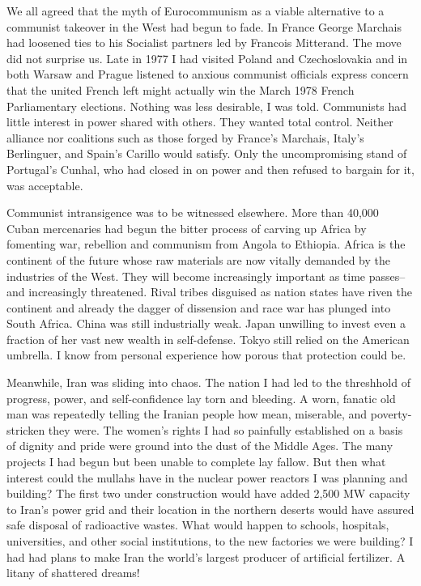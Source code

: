 We all agreed that the myth of Eurocommunism as a viable alternative to a communist takeover in the West had begun to fade. In France George Marchais had loosened ties to his Socialist partners led by Francois Mitterand. The move did not surprise us. Late in 1977 I had visited Poland and Czechoslovakia and in both Warsaw and Prague listened to anxious communist officials express concern that the united French left might actually win the March 1978 French Parliamentary elections. Nothing was less desirable, I was told. Communists had little interest in power shared with others. They wanted total control. Neither alliance nor coalitions such as those forged by France's Marchais, Italy's Berlinguer, and Spain's Carillo would satisfy. Only the uncompromising stand of Portugal's Cunhal, who had closed in on power and then refused to bargain for it, was acceptable. 

Communist intransigence was to be witnessed elsewhere. More than 40,000 Cuban mercenaries had begun the bitter process of carving up Africa by fomenting war, rebellion and communism from Angola to Ethiopia. Africa is the continent of the future whose raw materials are now vitally demanded by the industries of the West. They will become increasingly important as time passes--and increasingly threatened. Rival tribes disguised as nation states have riven the continent and already the dagger of dissension and race war has plunged into South Africa. China was still industrially weak. Japan unwilling to invest even a fraction of her vast new wealth in self-defense. Tokyo still relied on the American umbrella. I know from personal experience how porous that protection could be. 

Meanwhile, Iran was sliding into chaos. The nation I had led to the threshhold of progress, power, and self-confidence lay torn and bleeding. A worn, fanatic old man was repeatedly telling the Iranian people how mean, miserable, and poverty-stricken they were. The women’s rights I had so painfully established on a basis of dignity and pride were ground into the dust of the Middle Ages. The many projects I had begun but been unable to complete lay fallow. But then what interest could the mullahs have in the nuclear power reactors I was planning and building? The first two under construction would have added 2,500 MW capacity to Iran's power grid and their location in the northern deserts would have assured safe disposal of radioactive wastes. What would happen to schools, hospitals, universities, and other social institutions, to the new factories we were building? I had had plans to make Iran the world’s largest producer of artificial fertilizer. A litany of shattered dreams! 

